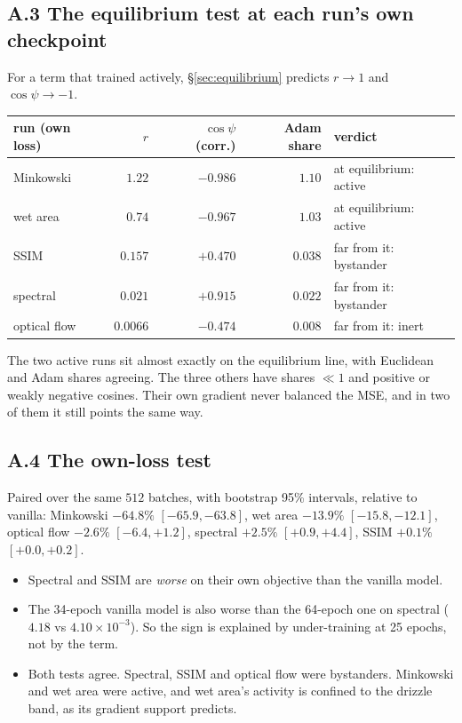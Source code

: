 \documentclass[11pt,a4paper]{article}
\theoremstyle{definition}
\theoremstyle{remark}
\begin{document}
\subsection*{A.3 The equilibrium test at each run's own checkpoint}
For a term that trained actively, \S\ref{sec:equilibrium} predicts $r\to1$ and $\cos\psi\to-1$.
\begin{center}
\begin{tabular}{@{}lrrrl@{}}
\toprule
run (own loss) & $r$ & $\cos\psi$ (corr.) & Adam share & verdict \\ \midrule
Minkowski   & $1.22$   & $-0.986$ & $1.10$   & at equilibrium: active \\
wet area    & $0.74$   & $-0.967$ & $1.03$   & at equilibrium: active \\
SSIM        & $0.157$  & $+0.470$ & $0.038$  & far from it: bystander \\
spectral    & $0.021$  & $+0.915$ & $0.022$  & far from it: bystander \\
optical flow& $0.0066$ & $-0.474$ & $0.008$  & far from it: inert \\ \bottomrule
\end{tabular}
\end{center}
The two active runs sit almost exactly on the equilibrium line, with Euclidean and Adam
shares agreeing. The three others have shares $\ll1$ and positive or weakly negative cosines.
Their own gradient never balanced the MSE, and in two of them it still points the same way.

\subsection*{A.4 The own-loss test}
Paired over the same $512$ batches, with bootstrap 95\% intervals, relative to vanilla:
Minkowski $-64.8\%$ $[-65.9,-63.8]$, wet area $-13.9\%$ $[-15.8,-12.1]$, optical flow
$-2.6\%$ $[-6.4,+1.2]$, spectral $+2.5\%$ $[+0.9,+4.4]$, SSIM $+0.1\%$ $[+0.0,+0.2]$.
\begin{itemize}[nosep]
\item Spectral and SSIM are \emph{worse} on their own objective than the vanilla model.
\item The 34-epoch vanilla model is also worse than the 64-epoch one on spectral
  ($4.18$ vs $4.10\times10^{-3}$). So the sign is explained by under-training at 25
  epochs, not by the term.
\item Both tests agree. Spectral, SSIM and optical flow were bystanders. Minkowski and wet
  area were active, and wet area's activity is confined to the drizzle band, as its
  gradient support predicts.
\end{itemize}
\end{document}

